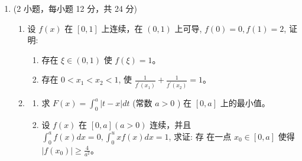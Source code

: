 \begin{enumerate}
{	
}

\newpage
\item 
(2 小题，每小题 12 分，共 24 分)
\begin{enumerate}
	\item
设 $f(x)$ 在 $[0,1]$ 上连续，在 $(0,1)$ 上可导, $f(0)=0, f(1)=2$, 证明:
\begin{enumerate}
	\item
 存在 $\xi \in(0,1)$ 使 $f(\xi)=1$。
\item 
存在 $0<x_{1}<x_{2}<1$, 使 $\frac{1}{f^{\prime}\left(x_{1}\right)}+\frac{1}{f^{\prime}\left(x_{2}\right)}=1$。
\end{enumerate}
	
	
\item 
\begin{enumerate}
	\item
	求 $F(x)=\int_{0}^{a}|t-x| d t$ (常数 $a>0$ ) 在 $[0, a]$ 上的最小值。
	\item 
	设 $f(x)$ 在 $[0, a](a>0)$ 连续，并且 $\int_{0}^{a} f(x) d x=0, \int_{0}^{u} x f(x) d x=1$, 求证: 存 在一点 $x_{0} \in[0, a]$ 使得 $\left|f\left(x_{0}\right)\right| \geqslant \frac{4}{a^{2}}$。
	
	
\end{enumerate}


	
	
	
	
\end{enumerate}



\end{enumerate}
